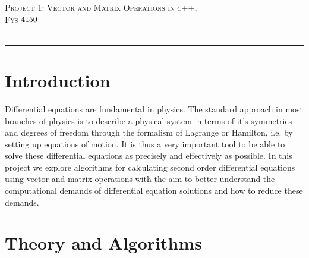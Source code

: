 \documentclass[a4paper,11pt]{article}
\newcommand*{\boisik}{\fontfamily{bsk}\selectfont} %
\begin{document}
{
\SetBgVshift{-1.2cm}
\SetBgHshift{-10.5cm}
$$\:$$
\begin{center}
\vspace{0.2cm}%
\fontsize{15}{15}\selectfont \textsc{ Project 1: Vector and Matrix Operations in c++},\\
\fontsize{13}{13}\selectfont \textsc{Fys $\textnormal{{4150}}$ }\\
\vspace{0.4cm}
\fontsize{12}{12}\\
\vspace{0.5cm}
\end{center}

\rule{\textwidth}{0.3pt}\par



\section*{Introduction}

Differential equations are fundamental in physics. The standard approach in most branches of physics is to describe a physical system in terms of it's symmetries and degrees of freedom through the formalism of Lagrange or Hamilton, i.e. by setting up equations of motion. It is thus a very important tool to be able to solve these differential equations as precisely and effectively as possible. In this project we explore algorithms for calculating second order differential equations using vector and matrix operations with the aim to better understand the computational demands of differential equation solutions and how to reduce these demands.



\section*{Theory and Algorithms}

}
\end{document}
